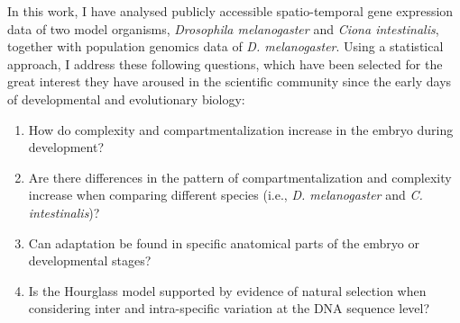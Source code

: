 \vspace{1cm}
In this work, I have analysed publicly accessible spatio-temporal gene expression data of two model organisms, \textit{Drosophila melanogaster} and \textit{Ciona intestinalis}, together with population genomics data of \textit{D. melanogaster}.
Using a statistical approach, I address these following questions, which have been selected for the great interest they have aroused in the scientific community since the early days of developmental and evolutionary biology:

\vspace{1cm}
\begin{enumerate}[label=\Roman*]

\item How do complexity and compartmentalization increase in the embryo during development?
\vspace{0.5cm}

\item Are there differences in the pattern of compartmentalization and complexity increase when comparing different species (i.e., \textit{D. melanogaster} and \textit{C. intestinalis})?
\vspace{0.5cm}

\item Can adaptation be found in specific anatomical parts of the embryo or developmental stages? 
\vspace{0.5cm}

\item Is the Hourglass model supported by evidence of natural selection when considering inter and intra-specific variation at the DNA sequence level?

\end{enumerate}
\vspace{1cm}

%
